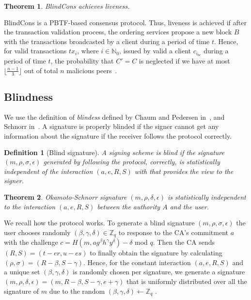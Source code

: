 \documentclass[conference]{IEEEtran}
\newcommand{\name}{BlindCons}
\newtheorem{definition}{Definition}
\newtheorem{theorem}{Theorem}
\begin{document}
\begin{theorem}
\name{} achieves liveness.
\end{theorem}

\begin{IEEEproof}
\name{} is a PBTF-based consensus protocol. Thus, liveness is achieved if after the transaction validation process, the ordering services propose a new block $B$ with the transactions broadcasted by a client during a period of time $t$. Hence, for valid transactions $tx_i$, where $i\in \mathbb{N}_0$, issued by valid a client $c_{i_{bc}}$ during a period of time $t$, the probability that $C'= C$ is neglected if we have at most $\lfloor\frac{n-1}{3}\rfloor$ out of total $n$ malicious peers~\cite{castro1999practical}.
\end{IEEEproof}

\subsection{Blindness}

We use the definition of \emph{blindess} defined by Chaum and Pedersen in~\cite{10.1007/3-540-48071-4_7}, and Schnorr in~\cite{schnorr2001security}. A signature is properly blinded if the signer cannot get any information about the signature if the receiver follows the protocol correctly.

\begin{definition}[Blind signature]
A signing scheme is \emph{blind} if the signature $(m,\rho,\sigma,\epsilon)$ generated by following the protocol, correctly, is statistically independent of the interaction $(a,e,R,S)$ with that provides the view to the signer.
\end{definition}

\begin{theorem}
Okamoto-Schnorr signature $(m,\rho,\delta,\epsilon)$ is statistically independent to the interaction $(a,e,R,S)$ between the authority $A$ and the user.
\end{theorem}

\begin{IEEEproof}
We recall how the protocol works. To generate a blind signature $(m,\rho,\sigma,\epsilon)$ the user chooses randomly $(\beta,\gamma,\delta)\in \mathbb{Z}_q$ to response to the CA's commitment $a$ with the challenge $c=H(m,ag^\beta h^\gamma y^\delta) -\delta$ mod $q$. Then the CA sends $(R,S)=(t-er,u-es)$ to finally obtain the signature by calculating $(\rho,\sigma)=(R-\beta,S-\gamma)$.
Hence, for the constant interaction $(a,e,R,S)$ and a unique set $(\beta,\gamma,\delta)$ is randomly chosen per signature, we generate a signature $(m,\rho,\delta,\epsilon)=(m,R-\beta,S-\gamma,e+\gamma)$ that is uniformly distributed over all the signature of $m$ due to the random $(\beta,\gamma,\delta) \gets \mathbb{Z}_q$ \cite{schnorr2001security}.
\end{IEEEproof}
\end{document}
